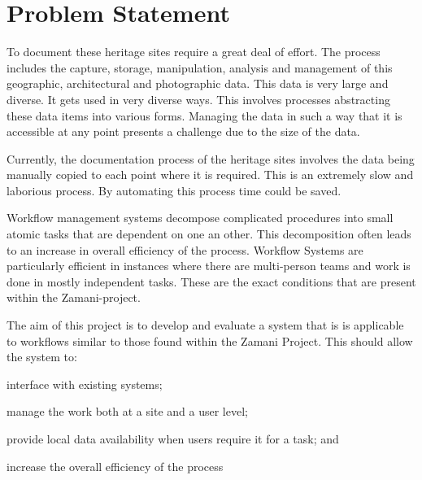 \section{Problem Statement}
    To document these heritage sites require a great deal of effort. The process includes
    the capture, storage, manipulation, analysis and management of this geographic,
    architectural and photographic data. This data is very large and diverse. It gets
    used in very diverse ways. This involves processes abstracting these data
    items into various forms. Managing the data in such a way that it is accessible
    at any point presents a challenge due to the size of the data.

    Currently, the documentation process of the heritage sites involves the data being
    manually copied to each point where it is required. This is an extremely slow and
    laborious process. By automating this process time could be saved.

    Workflow management systems decompose complicated procedures into small atomic tasks
    that are dependent on one an other\cite{Taylor:2006:WES:1196459}. This decomposition
    often leads to an increase in overall efficiency of the process. Workflow Systems
    are particularly efficient in instances where there are multi-person teams and work
    is done in mostly independent tasks. These are the exact conditions that
    are present within the Zamani-project.

    The aim of this project is to develop and evaluate a system that is is applicable
    to workflows similar to those found within the Zamani Project. This should allow the
    system to: \begin{inparaenum}[i)] \item interface with existing systems; \item manage the
    work both at a site and a user level; \item provide local data availability when users
    require it for a task; and \item increase the overall efficiency of the process
    \end{inparaenum}




